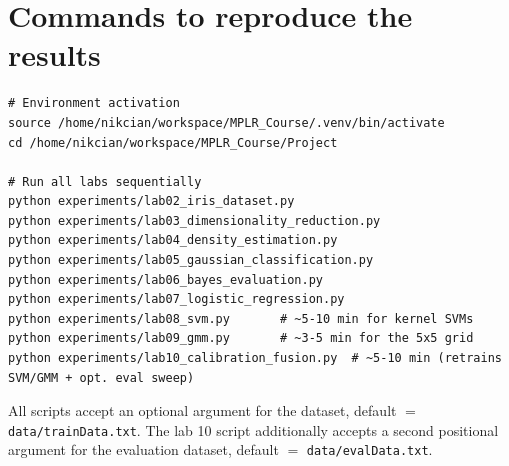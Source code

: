 \documentclass[11pt,a4paper]{article}
\begin{document}
\section{Commands to reproduce the results}

\begin{Verbatim}[fontsize=\small, frame=single]
# Environment activation
source /home/nikcian/workspace/MPLR_Course/.venv/bin/activate
cd /home/nikcian/workspace/MPLR_Course/Project

# Run all labs sequentially
python experiments/lab02_iris_dataset.py
python experiments/lab03_dimensionality_reduction.py
python experiments/lab04_density_estimation.py
python experiments/lab05_gaussian_classification.py
python experiments/lab06_bayes_evaluation.py
python experiments/lab07_logistic_regression.py
python experiments/lab08_svm.py       # ~5-10 min for kernel SVMs
python experiments/lab09_gmm.py       # ~3-5 min for the 5x5 grid
python experiments/lab10_calibration_fusion.py  # ~5-10 min (retrains SVM/GMM + opt. eval sweep)
\end{Verbatim}

All scripts accept an optional argument for the dataset, default $=$
\texttt{data/trainData.txt}. The lab 10 script additionally accepts a
second positional argument for the evaluation dataset, default $=$
\texttt{data/evalData.txt}.
\end{document}
